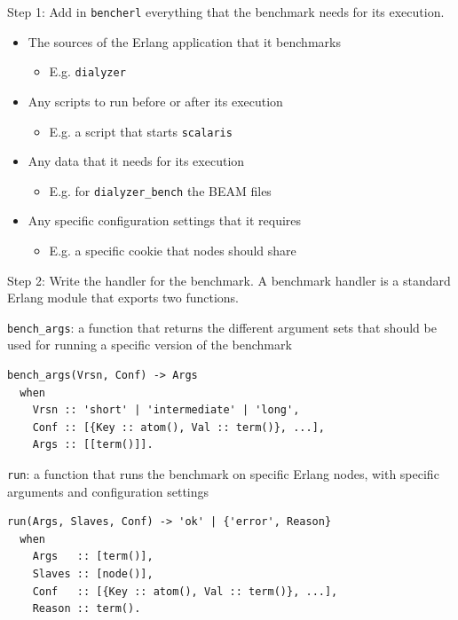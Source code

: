 \documentclass{beamer}
\begin{document}
\begin{frame}[t]{Step 1: Add in \texttt{bencherl} everything that the benchmark needs for its execution.}
	\begin{itemize}
		\item The sources of the \textcolor{burgundy}{Erlang application} that it benchmarks
			\begin{itemize}
				\item E.g. \texttt{dialyzer}
			\end{itemize}
		\item Any \textcolor{burgundy}{scripts} to run \textcolor{burgundy}{before} or \textcolor{burgundy}{after} its execution
            \begin{itemize}
                \item E.g. a script that starts \texttt{scalaris}
            \end{itemize}
		\item Any \textcolor{burgundy}{data} that it needs for its execution
            \begin{itemize}
                \item E.g. for \texttt{dialyzer\_bench} the BEAM files
            \end{itemize}
		\item Any specific \textcolor{burgundy}{configuration settings} that it requires
            \begin{itemize}
                \item E.g. a specific cookie that nodes should share
            \end{itemize}
	\end{itemize}
\end{frame}

\begin{frame}[fragile]{Step 2: Write the handler for the benchmark.}
	A \textcolor{burgundy}{benchmark handler} is a standard Erlang module that exports two functions.
	\vspace{10pt}

	\textcolor{burgundy}{\texttt{bench\_args}}: a function that returns the different argument sets that should be used for running a specific version of the benchmark

	\tiny
	\begin{verbatim}
bench_args(Vrsn, Conf) -> Args
  when
    Vrsn :: 'short' | 'intermediate' | 'long',
    Conf :: [{Key :: atom(), Val :: term()}, ...],
    Args :: [[term()]].
	\end{verbatim}
	\normalsize

	\textcolor{burgundy}{\texttt{run}}: a function that runs the benchmark on specific Erlang nodes, with specific arguments and configuration settings

	\tiny
    \begin{verbatim}
run(Args, Slaves, Conf) -> 'ok' | {'error', Reason}
  when
    Args   :: [term()],
    Slaves :: [node()],
    Conf   :: [{Key :: atom(), Val :: term()}, ...],
    Reason :: term().
	\end{verbatim}
	\normalsize

\end{frame}
\end{document}
